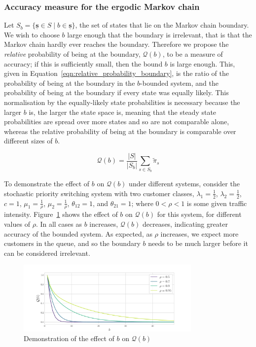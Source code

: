 \documentclass{article}
\begin{document}
\subsubsection{Accuracy measure for the ergodic Markov chain}\label{sec:ergodic_accuracy}
Let $S_b = \{\underline{\mathbf{s}} \in S \;|\; b \in \underline{\mathbf{s}}\}$,
the set of states that lie on the Markov chain boundary. We wish to choose $b$
large enough that the boundary is irrelevant, that is that the Markov chain
hardly ever reaches the boundary. Therefore we propose the \textit{relative}
probability of being at the boundary, $\mathcal{Q}(b)$, to be a measure of
accuracy; if this is sufficiently small, then the bound $b$ is large enough.
This, given in Equation~\ref{eqn:relative_probability_boundary}, is the ratio of
the probability of being at the boundary in the $b$-bounded system, and the
probability of being at the boundary if every state was equally likely. This
normalisation by the equally-likely state probabilities is necessary because the
larger $b$ is, the larger the state space is, meaning that the steady state
probabilities are spread over more states and so are not comparable alone,
whereas the relative probability of being at the boundary is comparable over
different sizes of $b$.

\begin{equation}\label{eqn:relative_probability_boundary}
\mathcal{Q}(b) = \frac{|S|}{|S_b|} \sum_{s \in S_b} \tilde{\pi}_s
\end{equation}

To demonstrate the effect of $b$ on $\mathcal{Q}(b)$ under different systems,
consider the stochastic priority switching system with two customer classes,
$\lambda_1 = \frac{1}{2}$, $\lambda_2 = \frac{1}{2}$, $c = 1$,
$\mu_1 = \frac{1}{\rho}$, $\mu_2 = \frac{1}{\rho}$, $\theta_{12} = 1$, and
$\theta_{21} = 1$; where $0 < \rho < 1$ is some given traffic intensity.
Figure~\ref{fig:ergodic_accuracy} shows the effect of $b$ on $\mathcal{Q}(b)$
for this system, for different values of $\rho$. In all cases as $b$ increases,
$\mathcal{Q}(b)$ decreases, indicating greater accuracy of the bounded system.
As expected, as $\rho$ increases, we expect more customers in the queue, and so
the boundary $b$ needs to be much larger before it can be considered irrelevant.

\begin{figure}
  \begin{center}
    \includegraphics[width=0.8\textwidth]{img/quotient_accuracy.pdf}
  \end{center}
  \caption{Demonstration of the effect of $b$ on $\mathcal{Q}(b)$}
  \label{fig:ergodic_accuracy}
\end{figure}
\end{document}
